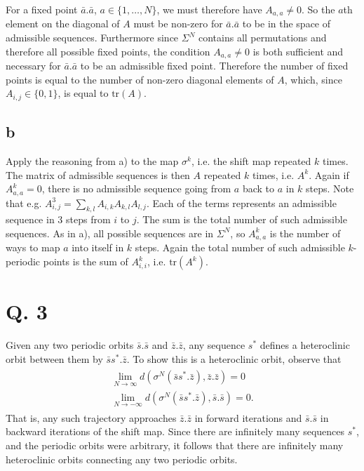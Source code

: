 \documentclass[12pt,A4]{article}
\begin{document}
For a fixed point $\bar{a}.\bar{a}$, $a \in \{1, \ldots , N\}$, we must therefore have $A_{a,a} \ne 0$. So the $a$th element on the diagonal of $A$ must be non-zero for $\bar{a}.\bar{a}$ to be in the space of admissible sequences. Furthermore since $\Sigma^N$ contains all permutations and therefore all possible fixed points, the condition $A_{a,a} \ne 0$ is both sufficient and necessary for $\bar{a}.\bar{a}$ to be an admissible fixed point. Therefore the number of fixed points is equal to the number of non-zero diagonal elements of $A$, which, since $A_{i,j} \in \{0,1\}$, is equal to $\text{tr}(A)$. 

\subsection*{b}
Apply the reasoning from a) to the map $\sigma^k$, i.e. the shift map repeated $k$ times. The matrix of admissible sequences is then $A$ repeated $k$ times, i.e. $A^k$. Again if $A^k_{a,a} = 0$, there is no admissible sequence going from $a$ back to $a$ in $k$ steps. Note that e.g. $A^3_{i,j} = \sum_{k,l} A_{i,k} A_{k,l} A_{l,j}$. Each of the terms represents an admissible sequence in 3 steps from $i$ to $j$. The sum is the total number of such admissible sequences. As in a), all possible sequences are in $\Sigma^N$, so $A^k_{a,a}$ is the number of ways to map $a$ into itself in $k$ steps. Again the total number of such admissible $k$-periodic points is the sum of $A^k_{i,i}$, i.e. $\text{tr}(A^k)$.

\clearpage
\section*{Q. 3}
Given any two periodic orbits $\bar{s}.\bar{s}$ and $\bar{z}.\bar{z}$, any sequence $s^*$ defines a heteroclinic orbit between them by $\bar{s} s^*.\bar{z}$. To show this is a heteroclinic orbit, observe that 
\begin{align}
\begin{aligned}
    \lim_{N \to \infty} d(\sigma^N (\bar{s} s^*.\bar{z}), \bar{z}.\bar{z}) = 0 \\
    \lim_{N \to -\infty} d(\sigma^N (\bar{s} s^*.\bar{z}), \bar{s}.\bar{s}) = 0.
\end{aligned}
\end{align}
That is, any such trajectory approaches $\bar{z}.\bar{z}$ in forward iterations and $\bar{s}.\bar{s}$ in backward iterations of the shift map. Since there are infinitely many sequences $s^*$, and the periodic orbits were arbitrary, it follows that there are infinitely many heteroclinic orbits connecting any two periodic orbits.
\end{document}
